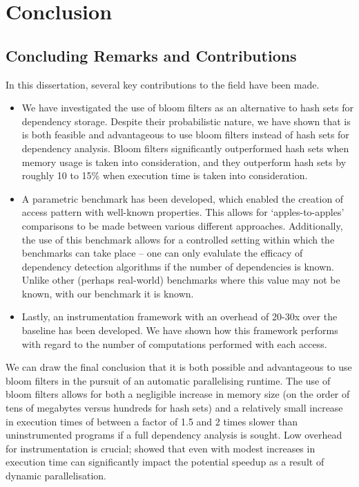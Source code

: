 \chapter{Conclusion} \label{chp:conclusion}
\section{Concluding Remarks and Contributions} \label{sec:conclusion/remarks}
In this dissertation, several key contributions to the field have been made.

\begin{itemize}
	\item We have investigated the use of bloom filters as an alternative to hash sets for dependency storage. Despite their probabilistic nature, we have shown that is is both feasible and advantageous to use bloom filters instead of hash sets for dependency analysis. Bloom filters significantly outperformed hash sets when memory usage is taken into consideration, and they outperform hash sets by roughly 10 to 15\% when execution time is taken into consideration.
	
	\item A parametric benchmark has been developed, which enabled the creation of access pattern with well-known properties. This allows for `apples-to-apples' comparisons to be made between various different approaches. Additionally, the use of this benchmark allows for a controlled setting within which the benchmarks can take place -- one can only evalulate the efficacy of dependency detection algorithms if the number of dependencies is known. Unlike other (perhaps real-world) benchmarks where this value may not be known, with our benchmark it is known.
	
	\item Lastly, an instrumentation framework with an overhead of 20-30x over the baseline has been developed. We have shown how this framework performs with regard to the number of computations performed with each access.
\end{itemize}

We can draw the final conclusion that it is both possible and advantageous to use bloom filters in the pursuit of an automatic parallelising runtime. The use of bloom filters allows for both a negligible increase in memory size (on the order of tens of megabytes versus hundreds for hash sets) and a relatively small increase in execution times of between a factor of 1.5 and 2 times slower than uninstrumented programs if a full dependency analysis is sought. Low overhead for instrumentation is crucial; \citet{EdlervonKoch2013} showed that even with modest increases in execution time can significantly impact the potential speedup as a result of dynamic parallelisation.

